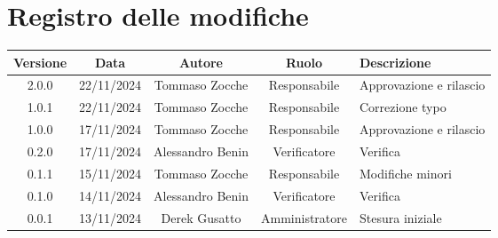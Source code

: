 \section*{Registro delle modifiche}
\begin{table}[H]
    \begin{tabular}{|c|c|c|c|p{3cm}|}
        \hline
        \textbf{Versione} & \textbf{Data} & \textbf{Autore} & \textbf{Ruolo} & \textbf{Descrizione} \\
        \hline
        2.0.0 & 22/11/2024 & Tommaso Zocche & Responsabile & Approvazione e rilascio \\
        \hline
        1.0.1 & 22/11/2024 & Tommaso Zocche & Responsabile & Correzione typo \\
        \hline
        1.0.0 & 17/11/2024 & Tommaso Zocche & Responsabile & Approvazione e rilascio \\
        \hline
        0.2.0 & 17/11/2024 & Alessandro Benin & Verificatore & Verifica \\
        \hline
        0.1.1 & 15/11/2024 & Tommaso Zocche & Responsabile & Modifiche minori \\
        \hline
        0.1.0 & 14/11/2024 & Alessandro Benin & Verificatore & Verifica \\
        \hline
        0.0.1 & 13/11/2024 & Derek Gusatto & Amministratore & Stesura iniziale \\
        \hline
    \end{tabular}
\end{table}
